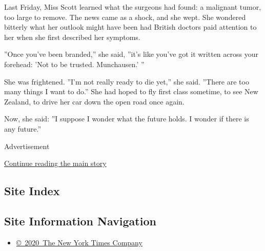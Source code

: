 Last Friday, Miss Scott learned what the surgeons had found: a malignant
tumor, too large to remove. The news came as a shock, and she wept. She
wondered bitterly what her outlook might have been had British doctors
paid attention to her when she first described her symptoms.

''Once you've been branded,'' she said, ''it's like you've got it
written across your forehead: 'Not to be trusted. Munchausen.' ''

She was frightened. ''I'm not really ready to die yet,'' she said.
''There are too many things I want to do.'' She had hoped to fly first
class sometime, to see New Zealand, to drive her car down the open road
once again.

Now, she said: ''I suppose I wonder what the future holds. I wonder if
there is any future.''

Advertisement

\protect\hyperlink{after-bottom}{Continue reading the main story}

\hypertarget{site-index}{%
\subsection{Site Index}\label{site-index}}

\hypertarget{site-information-navigation}{%
\subsection{Site Information
Navigation}\label{site-information-navigation}}

\begin{itemize}
\tightlist
\item
  \href{https://help.nytimes3xbfgragh.onion/hc/en-us/articles/115014792127-Copyright-notice}{©~2020~The
  New York Times Company}
\end{itemize}

